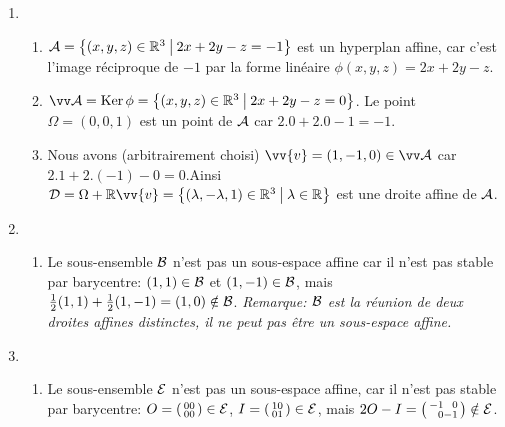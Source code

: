 \documentclass[a4paper,12pt,reqno]{amsart}
\begin{document}
\begin{solution}
  \begin{enumerate}[label=$\mathcal{\Alph*}$)]
    \item
      \begin{enumerate}[\bf a)]
        \item $\mathcal{A} = \big\{ (x,y,z) \in \mathbb{R}^{3} \:\big|\: 2x+2y-z=-1 \big\}$ est un hyperplan affine, car c'est l'image réciproque de $-1$ par la forme linéaire $\phi(x,y,z)=2x+2y-z$.
        \item $\ev{A} = \ker\phi = \big\{ (x,y,z) \in \mathbb{R}^{3} \:\big|\: 2x+2y-z=0 \big\}$. Le point $\Omega=(0,0,1)$ est un point de $\mathcal{A}$ car $2.0+2.0-1=-1$.
        \item Nous avons (arbitrairement choisi) $\vv{v}=(1,-1,0) \in \ev{A}$ car $2.1+2.(-1)-0=0$.\newline Ainsi $\ens{D}=\Omega+\mathbb{R}\vv{v} = \big\{ (\lambda,-\lambda,1) \in \mathbb{R}^{3} \:\big|\: \lambda \in \mathbb{R} \big\}$ est une droite affine de $\mathcal{A}$.
      \end{enumerate}
    \item
      \begin{enumerate}[\bf a)]
        \item Le sous-ensemble $\mathcal{B}$ n'est pas un sous-espace affine car il n'est pas stable par barycentre: $(1,1) \in \mathcal{B}$ et $(1,-1) \in \mathcal{B}$, mais $\frac12 (1,1)+\frac12 (1,-1)=(1,0) \notin \mathcal{B}$.\newline
        \textit{Remarque: $\mathcal{B}$ est la réunion de deux droites affines distinctes, il ne peut pas être un sous-espace affine.}
      \end{enumerate}
    \item
      \begin{enumerate}[\bf a)]
        \item Le sous-ensemble $\mathcal{E}$ n'est pas un sous-espace affine, car il n'est pas stable par barycentre: $O=\begin{psmallmatrix}0 0\\0 0\end{psmallmatrix} \in \mathcal{E}$, $I=\begin{psmallmatrix}1 0\\0 1\end{psmallmatrix} \in \mathcal{E}$, mais $2O-I=\begin{psmallmatrix}-1 \phantom{-}0\\\phantom{-}0 -1\end{psmallmatrix}\notin\mathcal{E}$.\newline

\end{enumerate}
\end{enumerate}
\end{solution}
\end{document}
